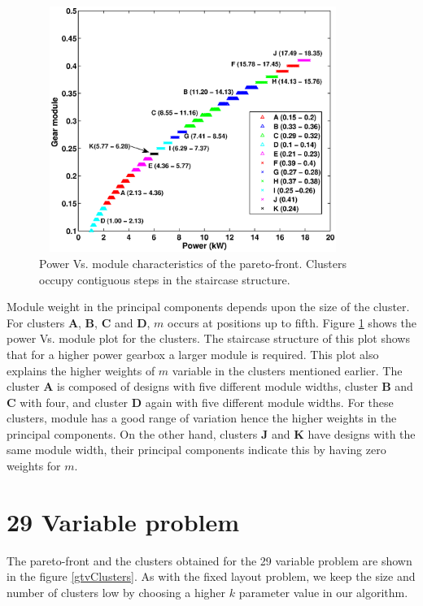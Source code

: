 \begin{figure}[ht]\begin{center}
 \includegraphics[width=100mm, height=80mm]{dia/gt11pVsm.eps}
 \caption{Power Vs. module characteristics of the pareto-front. Clusters occupy contiguous steps in the staircase structure.}
 \label{gt11pVsm}
\end{center}\end{figure}

Module weight in the principal components depends upon the size of the
cluster. For clusters \textbf{A}, \textbf{B}, \textbf{C} and \textbf{D},
$m$ occurs at positions up to fifth.  Figure \ref{gt11pVsm} shows the power
Vs. module plot for the clusters.  The staircase structure of this plot
shows that for a higher power gearbox a larger module is required. This
plot also explains the higher weights of $m$ variable in the clusters
mentioned earlier.  The cluster \textbf{A} is composed of designs with
five different module widths, cluster \textbf{B} and \textbf{C} with four,
and cluster \textbf{D} again with five different module widths. For these
clusters, module has a good range of variation hence the higher weights in
the principal components. On the other hand, clusters \textbf{J} and
\textbf{K} have designs with the same module width, their principal
components indicate this by having zero weights for $m$.




\section{29 Variable problem}

The pareto-front and the clusters obtained for the 29 variable problem
are shown in the figure \ref{gtvClusters}. As with the fixed layout problem,
we keep the size and number of clusters low by choosing a higher $k$ parameter 
value in our algorithm.


